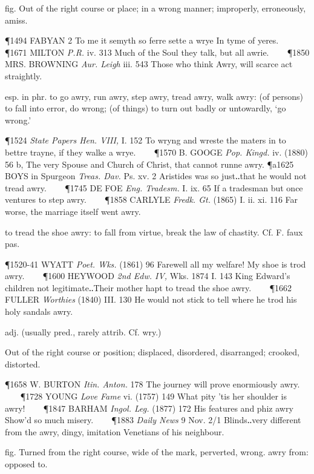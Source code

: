 \begin{description}[wide, labelwidth=!, labelindent=0pt]
\begin{myenumerate}
 fig. Out of the right course or place; in a wrong manner; improperly, erroneously, amiss.

\P 1494 FABYAN  2 To me it semyth so ferre sette a wrye In tyme of yeres.    
\P 1671 MILTON  \textit{P.R.} iv. 313 Much of the Soul they talk, but all awrie.    
\P 1850 MRS. BROWNING  \textit{Aur. Leigh} iii. 543 Those who think Awry, will scarce act straightly.

 esp. in phr. to go awry, run awry, step awry, tread awry, walk awry: (of persons) to fall into error, do wrong; (of things) to turn out badly or untowardly, ‘go wrong.’

\P 1524 \textit{State Papers Hen. VIII,} I. 152 To wryng and wreste the maters in to bettre trayne, if they walke a wrye.    
\P 1570 B. GOOGE  \textit{Pop. Kingd.} iv. (1880) 56 b, The very Spouse and Church of Christ, that cannot runne awry.
\P a1625 BOYS  in Spurgeon \textit{Treas. Dav.} Ps. xv. 2 Aristides was so just‥that he would not tread awry.    
\P 1745 DE FOE  \textit{Eng. Tradesm.} I. ix. 65 If a tradesman but once ventures to step awry.    
\P 1858 CARLYLE  \textit{Fredk. Gt.} (1865) I. ii. xi. 116 Far worse, the marriage itself went awry.

 to tread the shoe awry: to fall from virtue, break the law of chastity. Cf. F. faux pas.

\P 1520-41 WYATT  \textit{Poet. Wks.} (1861) 96 Farewell all my welfare! My shoe is trod awry.    
\P 1600 HEYWOOD  \textit{2nd Edw. IV,} Wks. 1874 I. 143  King Edward's children not legitimate‥Their mother hapt to tread the shoe awry.    
\P 1662 FULLER  \textit{Worthies} (1840) III. 130 He would not stick to tell where he trod his holy sandals awry.

 adj. (usually pred., rarely attrib. Cf. wry.)

 Out of the right course or position; displaced, disordered, disarranged; crooked, distorted.

\P 1658 W. BURTON  \textit{Itin. Anton.} 178 The journey will prove enormiously awry.    
\P 1728 YOUNG  \textit{Love Fame} vi. (1757) 149 What pity 'tis her shoulder is awry!    
\P 1847 BARHAM  \textit{Ingol. Leg.} (1877) 172 His features and phiz awry Show'd so much misery.    
\P 1883 \textit{Daily News} 9 Nov. 2/1 Blinds‥very different from the awry, dingy, imitation Venetians of his neighbour.

 fig. Turned from the right course, wide of the mark, perverted, wrong. awry from: opposed to.


\end{myenumerate}
\end{description}
